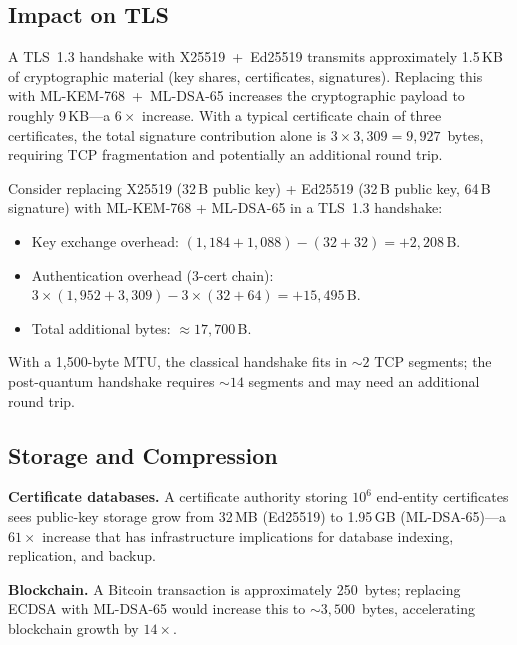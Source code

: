 \subsection{Impact on TLS}
\label{subsec:tls-impact}

A TLS~1.3 handshake with X25519~+~Ed25519 transmits approximately 1.5\,KB of cryptographic material (key shares, certificates, signatures).  Replacing this with ML-KEM-768~+~ML-DSA-65 increases the cryptographic payload to roughly 9\,KB---a $6\times$ increase.  With a typical certificate chain of three certificates, the total signature contribution alone is $3 \times 3{,}309 = 9{,}927$~bytes, requiring TCP fragmentation and potentially an additional round trip.

\begin{example}
\label{ex:tls-overhead}
Consider replacing X25519 (32\,B public key) + Ed25519 (32\,B public key, 64\,B signature) with ML-KEM-768 + ML-DSA-65 in a TLS~1.3 handshake:
\begin{itemize}
\item Key exchange overhead: $(1{,}184 + 1{,}088) - (32 + 32) = +2{,}208$\,B.
\item Authentication overhead (3-cert chain): $3 \times (1{,}952 + 3{,}309) - 3 \times (32 + 64) = +15{,}495$\,B.
\item Total additional bytes: $\approx 17{,}700$\,B.
\end{itemize}
With a 1{,}500-byte MTU, the classical handshake fits in $\sim\!2$ TCP segments; the post-quantum handshake requires $\sim\!14$ segments and may need an additional round trip.
\end{example}

\subsection{Storage and Compression}
\label{subsec:storage}

\textbf{Certificate databases.}  A certificate authority storing $10^6$ end-entity certificates sees public-key storage grow from 32\,MB (Ed25519) to 1.95\,GB (ML-DSA-65)---a $61\times$ increase that has infrastructure implications for database indexing, replication, and backup.

\textbf{Blockchain.}  A Bitcoin transaction is approximately 250~bytes; replacing ECDSA with ML-DSA-65 would increase this to $\sim\!3{,}500$~bytes, accelerating blockchain growth by $14\times$.

